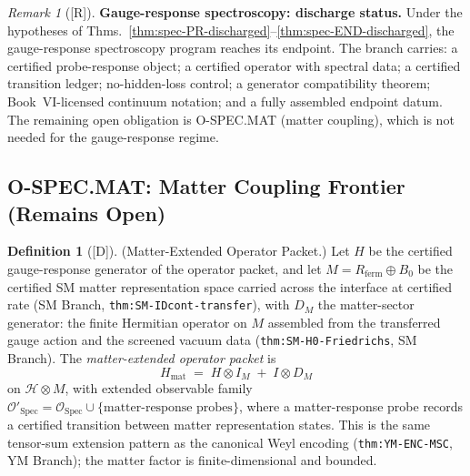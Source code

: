 \documentclass[12pt,oneside]{amsbook}
\theoremstyle{plain}
\theoremstyle{definition}
\newtheorem{definition}[theorem]{Definition}
\theoremstyle{remark}
\newtheorem{remark}[theorem]{Remark}
\newcommand{\status}[1]{\textup{[#1]}}
\begin{document}
\begin{remark}[\status{R}]\label{rem:spec-gauge-response-complete}
\textbf{Gauge-response spectroscopy: discharge status.}
Under the hypotheses of
Thms.~\ref{thm:spec-PR-discharged}--\ref{thm:spec-END-discharged}, the
gauge-response spectroscopy program reaches its endpoint. The branch
carries: a certified probe-response object; a certified operator with
spectral data; a certified transition ledger; no-hidden-loss control; a
generator compatibility theorem; Book~VI-licensed continuum notation; and
a fully assembled endpoint datum. The remaining open obligation is
O-SPEC.MAT (matter coupling), which is not needed for the
gauge-response regime.
\end{remark}

\subsection{O-SPEC.MAT: Matter Coupling Frontier (Remains Open)}
\label{sec:spec-MAT}

\begin{definition}[\status{D}]\label{def:spec-matter-packet}
\textup{(Matter-Extended Operator Packet.)}
Let $H$ be the certified gauge-response generator of the operator
packet, and let $M = R_{\mathrm{ferm}} \oplus B_0$ be the certified
SM matter representation space carried across the interface at
certified rate (SM Branch, \texttt{thm:SM-IDcont-transfer}), with
$D_M$ the matter-sector generator: the finite Hermitian operator on
$M$ assembled from the transferred gauge action and the screened
vacuum data (\texttt{thm:SM-H0-Friedrichs}, SM Branch).  The
\emph{matter-extended operator packet} is
\[
  H_{\mathrm{mat}} \;=\; H \otimes I_M \;+\; I \otimes D_M
\]
on $\mathcal{H} \otimes M$, with extended observable family
$\mathcal{O}'_{\mathrm{Spec}} = \mathcal{O}_{\mathrm{Spec}} \cup
\{\text{matter-response probes}\}$, where a matter-response probe
records a certified transition between matter representation states.
This is the same tensor-sum extension pattern as the canonical Weyl
encoding (\texttt{thm:YM-ENC-MSC}, YM Branch); the matter factor is
finite-dimensional and bounded.
\end{definition}
\end{document}
